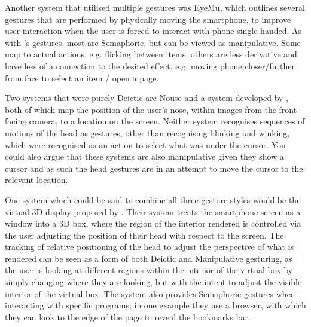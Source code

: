 Another system that utilised multiple gestures was EyeMu\cite{kong2021eyemu}, which outlines several gestures that are performed by physically moving the smartphone, to improve user interaction when the user is forced to interact with phone single handed.
As with \citeauthor{yan2018headgesture}'s gestures, most are Semaphoric, but can be viewed as manipulative.
Some map to actual actions, e.g. flicking between items, others are less derivative and have less of a connection to the desired effect, e.g. moving phone closer/further from face to select an item / open a page.

Two systems that were purely Deictic are Nouse\cite{gorodnichy2004nouse} and a system developed by \citeauthor{varona2008hands}\cite{varona2008hands}, both of which map the position of the user's nose, within images from the front-facing camera, to a location on the screen.
Neither system recognises sequences of motions of the head as gestures, other than recognising blinking and winking, which were recognised as an action to select what was under the cursor. 
You could also argue that these systems are also manipulative given they show a cursor and as such the head gestures are in an attempt to move the cursor to the relevant location.

One system which could be said to combine all three gesture styles would be the virtual 3D display proposed by \citeauthor{lopez2012head}\cite{lopez2012head}.
Their system treats the smartphone screen as a window into a 3D box, where the region of the interior rendered is controlled via the user adjusting the position of their head with respect to the screen.
The tracking of relative positioning of the head to adjust the perspective of what is rendered can be seen as a form of both Deictic and Manipulative gesturing, as the user is looking at different regions within the interior of the virtual box by simply changing where they are looking, but with the intent to adjust the visible interior of the virtual box.
The system also provides Semaphoric gestures when interacting with specific programs; in one example they use a browser, with which they can look to the edge of the page to reveal the bookmarks bar.


